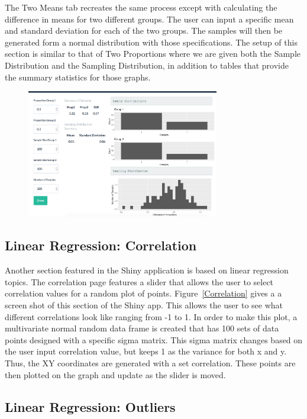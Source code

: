 \documentclass[11pt]{book}
\begin{document}
The Two Means tab recreates the same process except with calculating the difference in means for two different groups. The user can input a specific mean and standard deviation for each of the two groups. The samples will then be generated form a normal distribution with those specifications. The setup of this section is similar to that of Two Proportions where we are given both the Sample Distribution and the Sampling Distribution, in addition to tables that provide the summary statistics for those graphs.

\begin{figure}
\centering
        \includegraphics[width=0.75\textwidth]{TwoProp.png}
        \label{fig:TwoProp}
\end{figure}


\newpage

\subsection{Linear Regression: Correlation}
Another section featured in the Shiny application is based on linear regression topics. The correlation page features a slider that allows the user to select correlation values for a random plot of points. Figure~\ref{Correlation}  gives a a screen shot of this section of the Shiny app. This allows the user to see what different correlations look like ranging from -1 to 1. In order to make this plot, a multivariate normal random data frame is created that has 100 sets of data points designed with a specific sigma matrix.  This sigma matrix changes based on the user input correlation value, but keeps 1 as the variance for both x and y.  Thus, the XY coordinates are generated with a set correlation. These points are then plotted on the graph and update as the slider is moved. 



\subsection{Linear Regression: Outliers}
 
\end{document}
